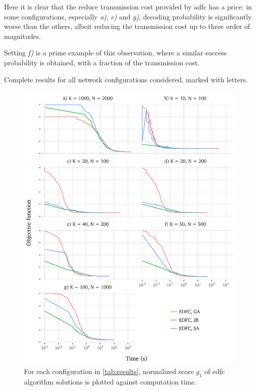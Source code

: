 \documentclass[12pt,journal,draftclsnofoot,onecolumn]{IEEEtran}
\begin{document}
Here it is clear that the reduce transmission cost provided by \gls{adfc} has a price: in some configurations, especially \emph{a)}, \emph{e)} and \emph{g)},  decoding probability is significantly worse than the others, albeit reducing the transmission cost up to three order of magnitudes.

Setting \emph{f)} is a prime example of this observation, where a similar success probability is obtained, with a fraction of the transmission cost.

\clearpage
\begin{table}[htp]
	\centering
	
	\caption{Complete results for all network configurations considered, marked with letters.}
	\label{tab:results}
\end{table}

\begin{figure}[htp]
	\includegraphics[]{figures/progress-edfc.png}
	\caption{For each configuration in \autoref{tab:results}, normalized score $g_1$ of \gls{edfc} algorithm solutions is plotted against computation time.}
	\label{fig:progress-edfc}
\end{figure}
\end{document}
